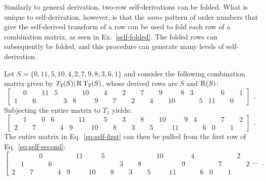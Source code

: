 Similarly to general derivation, two-row self-derivations can be folded. What is unique to self-derivation, however, is that the \emph{same} pattern of order numbers that give the self-derived transform of a row can be used to fold each row of a combination matrix, as seen in Ex.~\ref{self-folded}. The folded rows can subsequently be folded, and this procedure can generate many levels of self-derivation.

\begin{example}
    \cite[221]{Starr1984}
    \label{self-folded}
    Let $S = \{ 0, 11, 5, 10, 4, 2, 7, 9, 8, 3, 6, 1 \}$ and consider the following combination matrix given by $T_2(S) | \operatorname{R}\operatorname{T}_2(S)$, whose derived rows are $S$ and $\operatorname{R}(S)$:
    \begin{equation}
        \label{eq:self-first}
        \left[
        \begin{array}{cccccccccccc|cccccccccccc}
            & 0 && 11 & 5 &&& 10 && 4 && 2 && 7 && 9 && 8 & 3 &&& 6 && 1 \\
            1 && 6 &&& 3 & 8 && 9 && 7 && 2 && 4 && 10 &&& 5 & 11 && 0 &
        \end{array}
        \right] \enspace.
    \end{equation}
    Subjecting the entire matrix to $T_1$ yields:
    \begin{equation}
        \label{eq:self-second}
        \left[
        \begin{array}{cccccccccccc|cccccccccccc}
            & 1 && 0 & 6 &&& 11 && 5 && 3 && 8 && 10 && 9 & 4 &&& 7 && 2 \\
            2 && 7 &&& 4 & 9 && 10 && 8 && 3 && 5 && 11 &&& 6 & 0 && 1 &
        \end{array}
        \right] \enspace.
    \end{equation}
    The entire matrix in Eq.~\ref{eq:self-first} can then be pulled from the first row of Eq.~\ref{eq:self-second}:
    \begin{equation}
        \left[
        \begin{array}{cccccccccccc|cccccccccccc|c}
            &&& 0 &&&& 11 && 5 &&&&&& 10 &&& 4 &&&&& 2 & \\
            & 1 &&& 6 &&&&&&& 3 && 8 &&&& 9 &&&& 7 &&& 2 \\
            2 && 7 &&& 4 & 9 && 10 && 8 && 3 && 5 && 11 &&& 6 & 0 && 1 &&
        \end{array}
        \cdots \right. \enspace.
    \end{equation}
\end{example}

